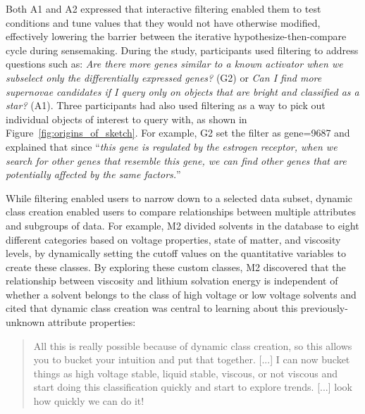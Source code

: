 \par Both A1 and A2 expressed that interactive filtering enabled them to test conditions and tune values that they would not have otherwise modified, effectively lowering the barrier between the iterative hypothesize-then-compare cycle during sensemaking.
During the study, participants used filtering to address questions such as: \textit{Are there more genes similar to a known activator when we subselect only the differentially expressed genes?} (G2) or \textit{Can I find more supernovae candidates if I query only on objects that are bright and classified as a star?} (A1). Three participants had also used filtering as a way to pick out individual objects of interest to query with, as shown in Figure~\ref{fig:origins_of_sketch}. For example, G2 set the filter as gene=9687 and explained that since ``\textit{this gene is regulated by the estrogen receptor, when we search for other genes that resemble this gene, we can find other genes that are potentially affected by the same factors.}''
\par While filtering enabled users to narrow down to a selected data subset, dynamic class creation enabled users to compare relationships between multiple attributes and subgroups of data. For example, M2 divided solvents in the database to eight different categories based on voltage properties, state of matter, and viscosity levels, by dynamically setting the cutoff values on the quantitative variables to create these classes. By exploring these custom classes, M2 discovered that the relationship between viscosity and lithium solvation energy is independent of whether a solvent belongs to the class of high voltage or low voltage solvents and cited that dynamic class creation was central to learning about this previously-unknown attribute properties:
\begin{quote}
All this is really possible because of dynamic class creation, so this allows you to bucket your intuition and put that together. [...] I can now bucket things as high voltage stable, liquid stable, viscous, or not viscous and start doing this classification quickly and start to explore trends. [...] look how quickly we can do it!%
\end{quote}
